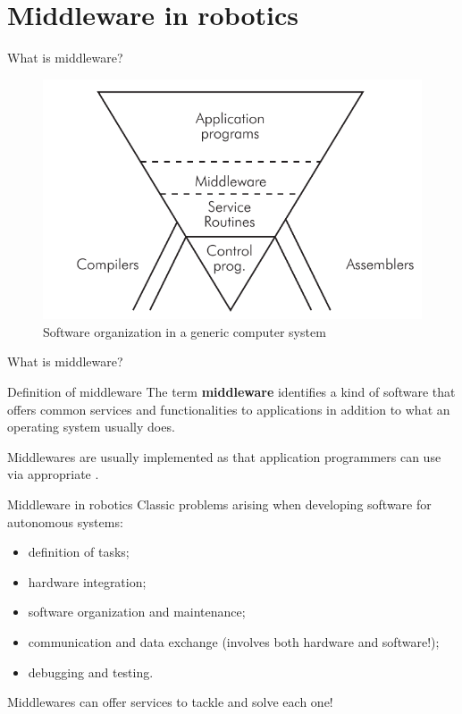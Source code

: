 
\section{Middleware in robotics}
\graphicspath{{figs/section1/}}

\begin{frame}{What is middleware?}
\begin{figure}
    \centering
    \includegraphics[width=.85\textwidth]{softwarePyramid.png}
    \caption{Software organization in a generic computer system}
    \label{fig:swpyramid}
\end{figure}
\end{frame}
\begin{frame}{What is middleware?}
\begin{block}{Definition of middleware}
    \justifying
    The term \textbf{middleware} identifies a kind of software that offers common services and functionalities to applications in addition to what an operating system usually does.
\end{block}
\justifying
Middlewares are usually implemented as  that application programmers can use via appropriate .
\end{frame}

\begin{frame}{Middleware in robotics}
\justifying
Classic problems arising when developing software for autonomous systems:
\begin{itemize}
    \item definition of tasks;
    \item hardware integration;
    \item software organization and maintenance;
    \item communication and data exchange (involves both hardware and software!);
    \item debugging and testing.
\end{itemize}
\begin{block}{}
    \centering
    Middlewares can offer services to tackle and solve each one!
\end{block}
\end{frame}

